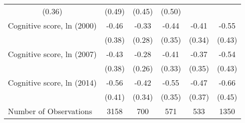 \begin{tabular}{llllll}
  \multicolumn{1}{c}{(0.36)} &
  \multicolumn{1}{c}{(0.49)} &
  \multicolumn{1}{c}{(0.45)} &
  \multicolumn{1}{c}{(0.50)} \\
\multicolumn{1}{l}{Cognitive score, ln (2000)} &
  \multicolumn{1}{c}{-0.46} &
  \multicolumn{1}{c}{-0.33} &
  \multicolumn{1}{c}{-0.44} &
  \multicolumn{1}{c}{-0.41} &
  \multicolumn{1}{c}{-0.55} \\
\multicolumn{1}{l}{} &
  \multicolumn{1}{c}{(0.38)} &
  \multicolumn{1}{c}{(0.28)} &
  \multicolumn{1}{c}{(0.35)} &
  \multicolumn{1}{c}{(0.34)} &
  \multicolumn{1}{c}{(0.43)} \\
\multicolumn{1}{l}{Cognitive score, ln (2007)} &
  \multicolumn{1}{c}{-0.43} &
  \multicolumn{1}{c}{-0.28} &
  \multicolumn{1}{c}{-0.41} &
  \multicolumn{1}{c}{-0.37} &
  \multicolumn{1}{c}{-0.54} \\
\multicolumn{1}{l}{} &
  \multicolumn{1}{c}{(0.38)} &
  \multicolumn{1}{c}{(0.26)} &
  \multicolumn{1}{c}{(0.33)} &
  \multicolumn{1}{c}{(0.35)} &
  \multicolumn{1}{c}{(0.43)} \\
\multicolumn{1}{l}{Cognitive score, ln (2014)} &
  \multicolumn{1}{c}{-0.56} &
  \multicolumn{1}{c}{-0.42} &
  \multicolumn{1}{c}{-0.55} &
  \multicolumn{1}{c}{-0.47} &
  \multicolumn{1}{c}{-0.66} \\
\multicolumn{1}{l}{} &
  \multicolumn{1}{c}{(0.41)} &
  \multicolumn{1}{c}{(0.34)} &
  \multicolumn{1}{c}{(0.35)} &
  \multicolumn{1}{c}{(0.37)} &
  \multicolumn{1}{c}{(0.45)} \\
\multicolumn{1}{l}{Number of Observations} &
  \multicolumn{1}{c}{3158} &
  \multicolumn{1}{c}{700} &
  \multicolumn{1}{c}{571} &
  \multicolumn{1}{c}{533} &
  \multicolumn{1}{c}{1350} \\
\cline{1-6}
\end{tabular}
